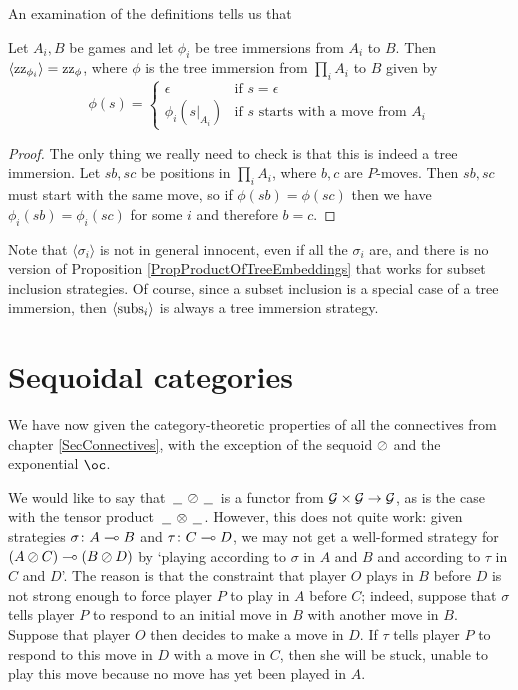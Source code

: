 \documentclass[11pt]{report}
\begin{document}
An examination of the definitions tells us that
\begin{proposition}
  Let $A_i,B$ be games and let $\phi_i$ be tree immersions from $A_i$ to $B$.  
  Then $\langle \operatorname{zz}_{\phi_i} \rangle = \operatorname{zz}_\phi$, where $\phi$ is the tree immersion from $\prod_iA_i$ to $B$ given by
  \[
    \phi(s) = \begin{cases}
      \epsilon & \text{if $s=\epsilon$} \\
      \phi_i(s\vert_{A_i}) & \text{if $s$ starts with a move from $A_i$}
    \end{cases}
    \]
  \label{PropProductOfTreeEmbeddings}
\end{proposition}
\begin{proof}
  The only thing we really need to check is that this is indeed a tree immersion.  
  Let $sb,sc$ be positions in $\prod_iA_i$, where $b,c$ are $P$-moves.
  Then $sb,sc$ must start with the same move, so if $\phi(sb)=\phi(sc)$ then we have $\phi_i(sb)=\phi_i(sc)$ for some $i$ and therefore $b=c$.
\end{proof}

Note that $\langle\sigma_i\rangle$ is not in general innocent, even if all the $\sigma_i$ are, and there is no version of Proposition \ref{PropProductOfTreeEmbeddings} that works for subset inclusion strategies.
Of course, since a subset inclusion is a special case of a tree immersion, then $\langle \operatorname{subs}_i\rangle$ is always a tree immersion strategy.

\section{Sequoidal categories}

We have now given the category-theoretic properties of all the connectives from chapter \ref{SecConnectives}, with the exception of the sequoid $\oslash$ and the exponential $\oc$.

We would like to say that $\,\underline{\hspace{1.5ex}}\,\oslash\,\underline{\hspace{1.5ex}}\,$ is a functor from $\mathcal G \times \mathcal G \to \mathcal G$, as is the case with the tensor product $\,\underline{\hspace{1.5ex}}\,\otimes\,\underline{\hspace{1.5ex}}\,$.  
However, this does not quite work: given strategies $\sigma\colon A \multimap B$ and $\tau\colon C \multimap D$, we may not get a well-formed strategy for $(A \oslash C) \multimap (B \oslash D)$ by `playing according to $\sigma$ in $A$ and $B$ and according to $\tau$ in $C$ and $D$'.  
The reason is that the constraint that player $O$ plays in $B$ before $D$ is not strong enough to force player $P$ to play in $A$ before $C$; indeed, suppose that $\sigma$ tells player $P$ to respond to an initial move in $B$ with another move in $B$.  
Suppose that player $O$ then decides to make a move in $D$.  
If $\tau$ tells player $P$ to respond to this move in $D$ with a move in $C$, then she will be stuck, unable to play this move because no move has yet been played in $A$.
\end{document}
